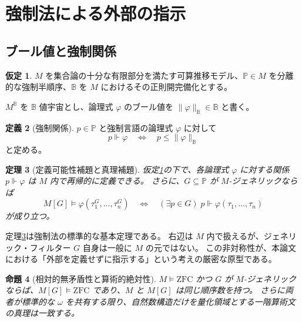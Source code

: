 \documentclass[11pt]{ltjsarticle}
\theoremstyle{plain}
\newtheorem{theorem}{定理}[section]
\newtheorem{proposition}[theorem]{命題}
\theoremstyle{definition}
\newtheorem{definition}[theorem]{定義}
\newtheorem{assumption}[theorem]{仮定}
\begin{document}
\section{強制法による外部の指示}
\label{sec:forcing}

\subsection{ブール値と強制関係}

\begin{assumption}\label{ass:forcing}
\(M\) を集合論の十分な有限部分を満たす可算推移モデル、\(\mathbb{P}\in M\) を分離的な強制半順序、\(\mathbb{B}\) を \(M\) におけるその正則開完備化とする。
\end{assumption}

\(M^{\mathbb{B}}\) を \(\mathbb{B}\) 値宇宙とし、論理式 \(\varphi\) のブール値を
\(\lVert\varphi\rVert_{\mathbb{B}}\in\mathbb{B}\) と書く。

\begin{definition}[強制関係]
\(p\in\mathbb{P}\) と強制言語の論理式 \(\varphi\) に対して
\[
p\Vdash\varphi
\quad\Longleftrightarrow\quad
p\leq\lVert\varphi\rVert_{\mathbb{B}}
\]
と定める。
\end{definition}

\begin{theorem}[定義可能性補題と真理補題]\label{thm:forcing}
仮定\ref{ass:forcing}の下で、各論理式 \(\varphi\) に対する関係
\(p\Vdash\varphi\) は \(M\) 内で再帰的に定義できる。
さらに、\(G\subseteq\mathbb{P}\) が \(M\)-ジェネリックならば
\[
M[G]\models\varphi(\tau_1^G,\ldots,\tau_n^G)
\quad\Longleftrightarrow\quad
(\exists p\in G)\;p\Vdash\varphi(\tau_1,\ldots,\tau_n)
\]
が成り立つ。
\end{theorem}

定理\ref{thm:forcing}は強制法の標準的な基本定理である\cite{cohen1963,bell1985,jech2003}。
右辺は \(M\) 内で扱えるが、ジェネリック・フィルター \(G\) 自身は一般に \(M\) の元ではない。
この非対称性が、本論文における「外部を定義せずに指示する」という考えの厳密な原型である。

\begin{proposition}[相対的無矛盾性と算術的絶対性]\label{prop:preservation}
\(M\models\mathrm{ZFC}\) かつ \(G\) が \(M\)-ジェネリックならば、\(M[G]\models\mathrm{ZFC}\) であり、\(M\) と \(M[G]\) は同じ順序数を持つ。
さらに両者が標準的な \(\omega\) を共有する限り、自然数構造だけを量化領域とする一階算術文の真理は一致する。
\end{proposition}
\end{document}
